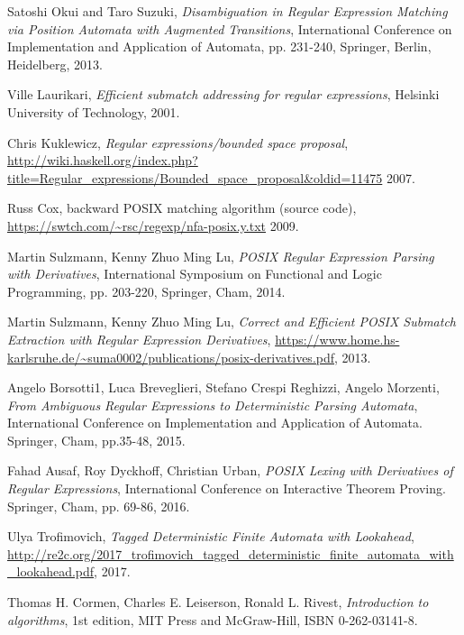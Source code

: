 \documentclass[AMA,STIX1COL]{WileyNJD-v2}
\begin{document}
\begin{thebibliography}{99}

    Satoshi Okui and Taro Suzuki,
    \textit{Disambiguation in Regular Expression Matching via Position Automata with Augmented Transitions},
    International Conference on Implementation and Application of Automata, pp. 231-240, Springer, Berlin, Heidelberg,
    2013.

    Ville Laurikari,
    \textit{Efficient submatch addressing for regular expressions},
    Helsinki University of Technology,
    2001.

    Chris Kuklewicz,
    \textit{Regular expressions/bounded space proposal},
    \url{http://wiki.haskell.org/index.php?title=Regular_expressions/Bounded_space_proposal&oldid=11475}
    2007.

    Russ Cox,
    backward POSIX matching algorithm (source code),
    \url{https://swtch.com/~rsc/regexp/nfa-posix.y.txt}
    2009.

    Martin Sulzmann, Kenny Zhuo Ming Lu,
    \textit{POSIX Regular Expression Parsing with Derivatives},
    International Symposium on Functional and Logic Programming, pp. 203-220, Springer, Cham,
    2014.

    Martin Sulzmann, Kenny Zhuo Ming Lu,
    \textit{Correct and Efficient POSIX Submatch Extraction with Regular Expression Derivatives},
    \url{https://www.home.hs-karlsruhe.de/~suma0002/publications/posix-derivatives.pdf},
    2013.

    Angelo Borsotti1, Luca Breveglieri, Stefano Crespi Reghizzi, Angelo Morzenti,
    \textit{From Ambiguous Regular Expressions to Deterministic Parsing Automata},
    International Conference on Implementation and Application of Automata. Springer, Cham, pp.35-48,
    2015.

    Fahad Ausaf, Roy Dyckhoff, Christian Urban,
    \textit{POSIX Lexing with Derivatives of Regular Expressions},
    International Conference on Interactive Theorem Proving. Springer, Cham, pp. 69-86,
    2016.

    Ulya Trofimovich,
    \textit{Tagged Deterministic Finite Automata with Lookahead},
    \url{http://re2c.org/2017_trofimovich_tagged_deterministic_finite_automata_with_lookahead.pdf},
    2017.

    Thomas H. Cormen, Charles E. Leiserson, Ronald L. Rivest,
    \textit{Introduction to algorithms},
    1st edition,
    MIT Press and McGraw-Hill,
    ISBN 0-262-03141-8.


\end{thebibliography}
\end{document}
